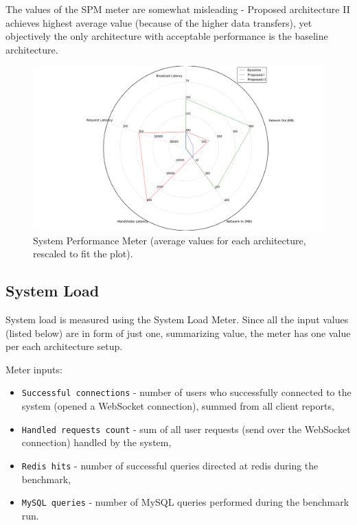 \documentclass{uvamscse}
\begin{document}
The values of the SPM meter are somewhat misleading - Proposed architecture II achieves highest average value (because of the higher data transfers), yet objectively the only architecture with acceptable performance is the baseline architecture.

\begin{figure}[H]
\centering
\includegraphics[scale=0.3]{spm}
\caption{System Performance Meter (average values for each architecture, rescaled to fit the plot).}
\label{figure:spm}
\end{figure}

\subsection{System Load}
System load is measured using the System Load Meter. Since all the input values (listed below) are in form of just one, summarizing value, the meter has one value per each architecture setup.

Meter inputs:
\begin{itemize}
  \item \texttt{Successful connections} - number of users who successfully connected to the system (opened a WebSocket connection), summed from all client reports,
  \item \texttt{Handled requests count} - sum of all user requests (send over the WebSocket connection) handled by the system,
  \item \texttt{Redis hits} - number of successful queries directed at redis during the benchmark,
  \item \texttt{MySQL queries} - number of MySQL queries performed during the benchmark run.
\end{itemize}
\end{document}
